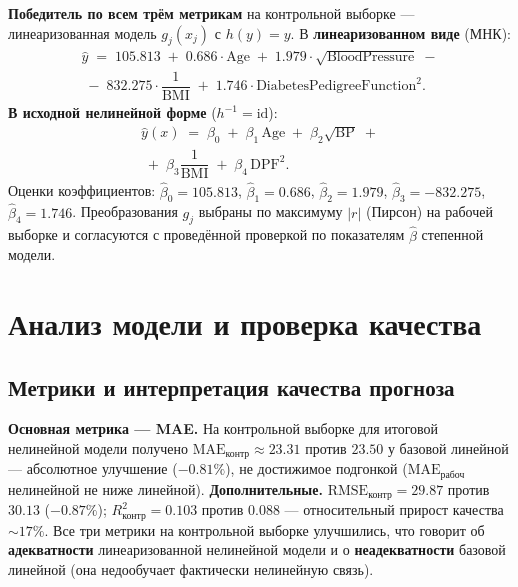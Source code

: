 \documentclass[a4paper, 14pt]{extarticle}
\begin{document}
\textbf{Победитель по всем трём метрикам} на контрольной выборке --- линеаризованная модель
$g_j(x_j)$ с $h(y)=y$. В \textbf{линеаризованном виде} (МНК):
\begin{equation*}
\begin{multlined}
\hat y \;=\; 105.813 \;+\; 0.686\cdot\text{Age} \;+\; 1.979\cdot\sqrt{\text{BloodPressure}}\;-\\
\;-\; 832.275\cdot\dfrac{1}{\text{BMI}} \;+\; 1.746\cdot\text{DiabetesPedigreeFunction}^{2}.
\end{multlined}
\end{equation*}
\textbf{В исходной нелинейной форме} ($h^{-1}=\mathrm{id}$):
\begin{equation*}
\boxed{\;
\begin{multlined}
\hat y(x) \;=\; \beta_0 \;+\; \beta_1\,\text{Age} \;+\; \beta_2\sqrt{\text{BP}}\;+\\
\;+\; \beta_3\dfrac{1}{\text{BMI}} \;+\; \beta_4\,\text{DPF}^{2}.
\end{multlined}\;}
\end{equation*}
Оценки коэффициентов: $\hat\beta_0=105.813$, $\hat\beta_1=0.686$, $\hat\beta_2=1.979$, $\hat\beta_3=-832.275$,
$\hat\beta_4=1.746$. Преобразования $g_j$ выбраны по максимуму $|r|$ (Пирсон) на рабочей выборке
и согласуются с проведённой проверкой по показателям $\hat\beta$ степенной модели.

\section{Анализ модели и проверка качества}

\subsection{Метрики и интерпретация качества прогноза}
\textbf{Основная метрика --- MAE.} На контрольной выборке для итоговой нелинейной модели получено
$\mathrm{MAE}_{\text{контр}}\approx 23.31$ против $23.50$ у базовой линейной --- абсолютное улучшение
($-0.81\%$), не достижимое подгонкой ($\mathrm{MAE}_{\text{рабоч}}$ нелинейной не ниже линейной).
\textbf{Дополнительные.} $\mathrm{RMSE}_{\text{контр}}=29.87$ против $30.13$ ($-0.87\%$);
$R^2_{\text{контр}}=0.103$ против $0.088$ --- относительный прирост качества $\sim 17\%$.
Все три метрики на контрольной выборке улучшились, что
говорит об \textbf{адекватности} линеаризованной нелинейной модели и
о \textbf{неадекватности} базовой линейной (она недообучает фактически нелинейную связь).
\end{document}
